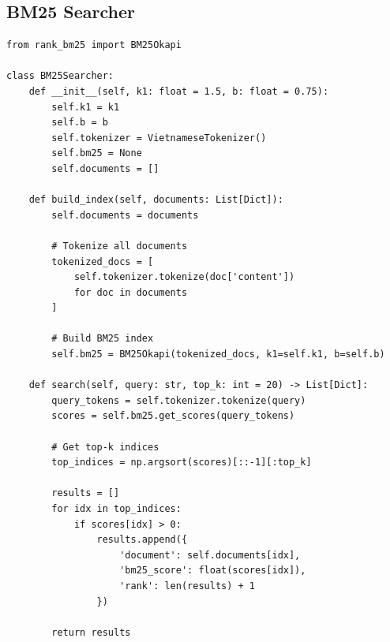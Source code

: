 \documentclass[../DoAn.tex]{subfiles}
\begin{document}
\subsection{BM25 Searcher}
\begin{verbatim}
from rank_bm25 import BM25Okapi

class BM25Searcher:
    def __init__(self, k1: float = 1.5, b: float = 0.75):
        self.k1 = k1
        self.b = b
        self.tokenizer = VietnameseTokenizer()
        self.bm25 = None
        self.documents = []
    
    def build_index(self, documents: List[Dict]):
        self.documents = documents
        
        # Tokenize all documents
        tokenized_docs = [
            self.tokenizer.tokenize(doc['content'])
            for doc in documents
        ]
        
        # Build BM25 index
        self.bm25 = BM25Okapi(tokenized_docs, k1=self.k1, b=self.b)
    
    def search(self, query: str, top_k: int = 20) -> List[Dict]:
        query_tokens = self.tokenizer.tokenize(query)
        scores = self.bm25.get_scores(query_tokens)
        
        # Get top-k indices
        top_indices = np.argsort(scores)[::-1][:top_k]
        
        results = []
        for idx in top_indices:
            if scores[idx] > 0:
                results.append({
                    'document': self.documents[idx],
                    'bm25_score': float(scores[idx]),
                    'rank': len(results) + 1
                })
        
        return results
\end{verbatim}
\end{document}
